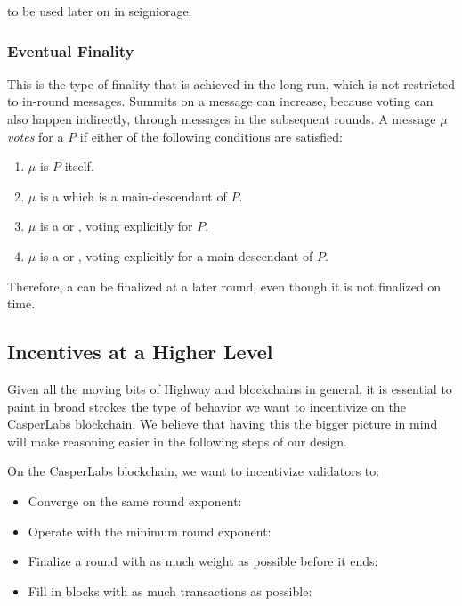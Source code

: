 to be used later on in seigniorage.

\subsubsection*{Eventual Finality}
\label{sec:eventual-finality}

This is the type of finality that is achieved in the long run, which is not restricted to in-round messages. Summits on a message can increase, because voting can also happen indirectly, through messages in the subsequent rounds. A message $\mu$ \emph{votes} for a \PROP $P$ if either of the following conditions are satisfied:

\begin{enumerate}
\def\labelenumi{\arabic{enumi}.}
\item $\mu$ is $P$ itself.
\item $\mu$ is a \PROP which is a main-descendant of $P$.
\item $\mu$ is a \CONF or \WIT, voting explicitly for $P$.
\item $\mu$ is a \CONF or \WIT, voting explicitly for a main-descendant of $P$.
\end{enumerate}

Therefore, a \PROP can be finalized at a later round, even though it is not finalized on time.

\subsection{Incentives at a Higher Level}

Given all the moving bits of Highway and blockchains in general, it is essential to paint in broad strokes the type of behavior we want to incentivize on the CasperLabs blockchain. We believe that having this the bigger picture in mind will make reasoning easier in the following steps of our design.

On the CasperLabs blockchain, we want to incentivize validators to:

\begin{itemize}
\item Converge on the same round exponent:
\item Operate with the minimum round exponent:
\item Finalize a round with as much weight as possible before it ends:
\item Fill in blocks with as much transactions as possible:
\end{itemize}




